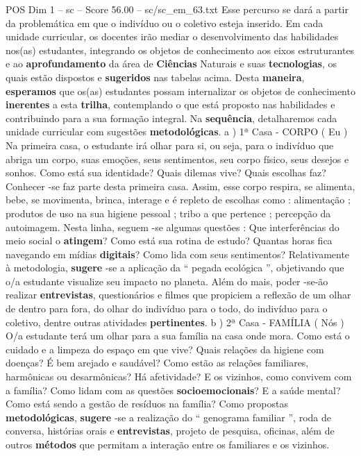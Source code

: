 \begin{textsample}{POS Dim 1 – sc – Score 56.00 – sc/sc\_em\_63.txt}
Esse percurso se dará a partir da problemática em que o indivíduo ou o coletivo esteja inserido.
Em cada unidade curricular, os docentes irão mediar o desenvolvimento das habilidades nos(as) estudantes, integrando os objetos de conhecimento aos eixos estruturantes e ao \textbf{aprofundamento} da área de \textbf{Ciências} Naturais e suas \textbf{tecnologias}, os quais estão dispostos e \textbf{sugeridos} nas tabelas acima.
Desta \textbf{maneira}, \textbf{esperamos} que os(as) estudantes possam internalizar os objetos de conhecimento \textbf{inerentes} a esta \textbf{trilha}, contemplando o que está proposto nas habilidades e contribuindo para a sua formação integral.
Na \textbf{sequência}, detalharemos cada unidade curricular com sugestões \textbf{metodológicas}. a ) 1ª Casa - CORPO ( Eu ) Na primeira casa, o estudante irá olhar para si, ou seja, para o indivíduo que abriga um corpo, suas emoções, seus sentimentos, seu corpo físico, seus desejos e sonhos.
Como está sua identidade?
Quais dilemas vive?
Quais escolhas faz?
Conhecer -se faz parte desta primeira casa.
Assim, esse corpo respira, se alimenta, bebe, se movimenta, brinca, interage e é repleto de escolhas como : alimentação ; produtos de uso na sua higiene pessoal ; tribo a que pertence ; percepção da autoimagem.
Nesta linha, seguem -se algumas questões : Que interferências do meio social o \textbf{atingem}?
Como está sua rotina de estudo?
Quantas horas fica navegando em mídias \textbf{digitais}?
Como lida com seus sentimentos?
Relativamente à metodologia, \textbf{sugere} -se a aplicação da “ pegada ecológica ”, objetivando que o/a estudante visualize seu impacto no planeta.
Além do mais, poder -se-ão realizar \textbf{entrevistas}, questionários e filmes que propiciem a reflexão de um olhar de dentro para fora, do olhar do indivíduo para o todo, do indivíduo para o coletivo, dentre outras atividades \textbf{pertinentes}. b ) 2ª Casa - FAMÍLIA ( Nós ) O/a estudante terá um olhar para a sua família na casa onde mora.
Como está o cuidado e a limpeza do espaço em que vive?
Quais relações da higiene com doenças?
É bem arejado e saudável?
Como estão as relações familiares, harmônicas ou desarmônicas?
Há afetividade?
E os vizinhos, como convivem com a família?
Como lidam com as questões \textbf{socioemocionais}?
E a saúde mental?
Como está sendo a gestão de resíduos na família?
Como propostas \textbf{metodológicas}, \textbf{sugere} -se a realização do “ genograma familiar ”, roda de conversa, histórias orais e \textbf{entrevistas}, projeto de pesquisa, oficinas, além de outros \textbf{métodos} que permitam a interação entre os familiares e os vizinhos.

\end{textsample}
